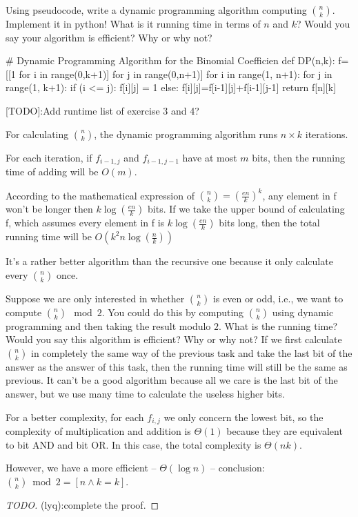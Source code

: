\documentclass[11pt,a4paper,oneside]{article}
\begin{document}
\begin{problem}{4}
    Using pseudocode, write a dynamic programming algorithm
    computing ${n \choose k}$. Implement it in python! What is it running time
    in terms of $n$ and $k$?
    Would you say your algorithm is efficient? Why or why not?
    \solution
\begin{python}
# Dynamic Programming Algorithm for the Binomial Coefficien
def DP(n,k):
	f=[[1 for i in range(0,k+1)] for j in range(0,n+1)]
	for i in range(1, n+1):
    	for j in range(1, k+1):
    		if (i <= j):
    			f[i][j] = 1
    		else:
    			f[i][j]=f[i-1][j]+f[i-1][j-1]
	return f[n][k]
\end{python}
    
    [TODO]:Add runtime list of exercise 3 and 4?
    
	For calculating ${n \choose k}$, the dynamic programming algorithm runs $n \times k$ iterations.
	
	For each iteration, if $f_{i-1,j}$ and $f_{i-1,j-1}$ have at most $m$ bits, then the running time of adding will be $O(m)$.
    
    According to the mathematical expression of ${n \choose k}=(\frac{en}{k})^k$, any element in f won't be longer then $k\log(\frac{en}{k})$ bits. If we take the upper bound of calculating f, which assumes every element in f is $k\log(\frac{en}{k})$ bits long, then the total running time will be $O(k^2n\log(\frac{n}{k}))$
    
    It's a rather better algorithm than the recursive one because it only calculate every ${n \choose k}$ once.

\end{problem}

\begin{problem}{5}
    \statement
    Suppose we are only interested in whether ${n \choose k}$ is even or odd,
  i.e., we want to compute ${n \choose k}  \mod 2$. You could do this by computing 
  ${n \choose k}$ using dynamic programming and then taking
  the result modulo $2$. What is the running time? Would you say this algorithm
  is efficient? Why or why not?
  \solution
If we first calculate ${n \choose k}$ in completely the same way of the previous task and take the last bit of the answer as the answer of this task, then the running time will still be the same as previous. It can't be a good algorithm because all we care is the last bit of the answer, but we use many time to calculate the useless higher bits.

For a better complexity, for each $f_{i, j}$ we only concern the lowest bit, so the complexity of multiplication and addition is $\Theta(1)$ because they are equivalent to bit AND and bit OR. In this case, the total complexity is $\Theta(nk)$.

However, we have a more efficient  -- $\Theta (\log n)$ -- conclusion:  $ {n \choose k} \bmod 2 = [n \wedge k = k]$.
\begin{proof} 
[TODO](lyq):complete the proof.
\end{proof}
\end{problem}
\end{document}
